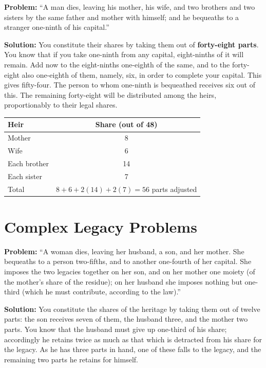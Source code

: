 \documentclass[11pt,a4paper,openany,oneside]{book}
\begin{document}
\textbf{Problem:} ``A man dies, leaving his mother, his wife, and two
brothers and two sisters by the same father and mother with himself; and he
bequeaths to a stranger one-ninth of his capital.''

\textbf{Solution:} You constitute their shares by taking them out of
\textbf{forty-eight parts}. You know that if you take one-ninth from any
capital, eight-ninths of it will remain. Add now to the eight-ninths
one-eighth of the same, and to the forty-eight also one-eighth of them,
namely, six, in order to complete your capital. This gives fifty-four. The
person to whom one-ninth is bequeathed receives six out of this. The
remaining forty-eight will be distributed among the heirs, proportionably to
their legal shares.

\begin{mathbox}
\begin{center}
\begin{tabular}{l|c}
\textbf{Heir} & \textbf{Share (out of 48)} \\
\hline
Mother & 8 \\
Wife & 6 \\
Each brother & 14 \\
Each sister & 7 \\
\hline
Total & $8 + 6 + 2(14) + 2(7) = 56$ parts adjusted \\
\end{tabular}
\end{center}
\end{mathbox}

\section*{Complex Legacy Problems}

\textbf{Problem:} ``A woman dies, leaving her husband, a son, and her
mother. She bequeaths to a person two-fifths, and to another one-fourth of
her capital. She imposes the two legacies together on her son, and on her
mother one moiety (of the mother's share of the residue); on her husband she
imposes nothing but one-third (which he must contribute, according to the
law).''

\textbf{Solution:} You constitute the shares of the heritage by taking them
out of twelve parts: the son receives seven of them, the husband three, and
the mother two parts. You know that the husband must give up one-third of
his share; accordingly he retains twice as much as that which is detracted
from his share for the legacy. As he has three parts in hand, one of these
falls to the legacy, and the remaining two parts he retains for himself.
\end{document}
